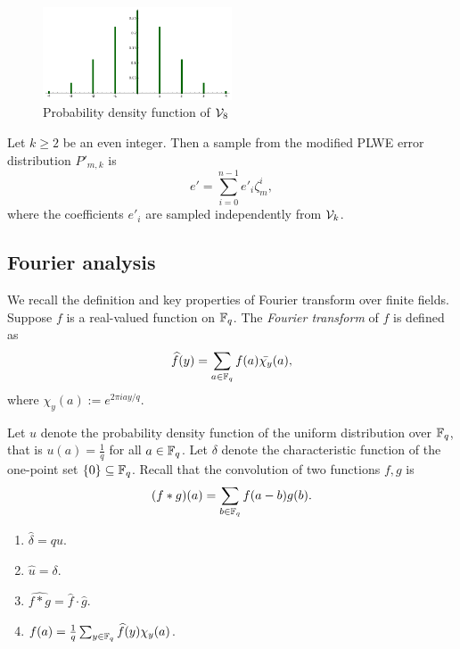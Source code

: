 \documentclass{amsart}
\begin{document}
\begin{figure}[h!]
\centering
\includegraphics[width = 0.5\textwidth]{v8.png}
\caption{Probability density function of $\mathcal{V}_{8}$}
\end{figure}


\begin{Definition}
\label{def: modified distribution}
Let $k \geq 2$ be an even integer. Then a sample from the modified PLWE error distribution $P'_{m,k}$ is
\[
    e' = \sum_{i=0}^{n-1} e'_i \zeta_m^{i},
\]
where the coefficients $e'_i$ are sampled independently from $\mathcal{V}_k$.
\end{Definition}




\subsection{Fourier analysis}
We recall the definition and key properties of Fourier transform over finite fields.
Suppose $f$ is a real-valued function on $\mathbb{F}_q$. The {\it Fourier transform} of $f$ is defined as
\[
    \widehat{f}(y) = \sum_{a \in \mathbb{F}_q} f(a) \bar{\chi_y}(a),
\]
where $\chi_y(a) := e^{2 \pi i ay/q}$.

Let $u$ denote the probability density function of the uniform distribution over $\mathbb{F}_q$, that is $u(a) = \frac{1}{q}$ for all $a \in \mathbb{F}_q$. Let $\delta$ denote the characteristic function of the
one-point set $\{0\} \subseteq \mathbb{F}_q$. Recall that the convolution of two functions $f,g$ is
\[
    (f  \ast g ) (a) = \sum_{b \in \mathbb{F}_q} f(a-b)g(b).
\]
\begin{Fact} \label{fact: basicfourier}\qquad
\begin{enumerate}
\item $\widehat{\delta} = qu$.

\item  $\widehat{u} = \delta$.

\item $\widehat{f \ast g} = \widehat{f} \cdot \widehat{g}$.


\item $f(a) = \frac{1}{q} \sum_{y \in \mathbb{F}_q} \widehat{f}(y)\chi_y(a)$.

\end{enumerate}
\end{Fact}
\end{document}
